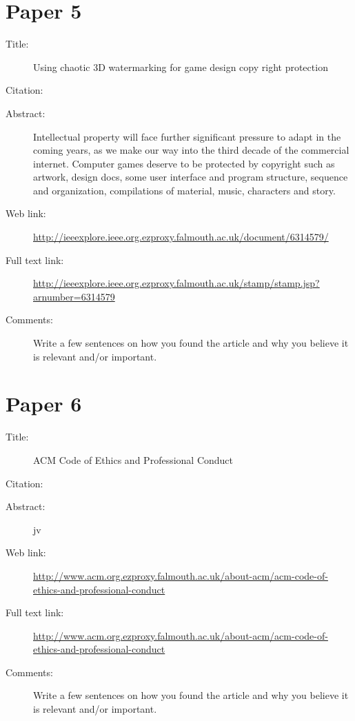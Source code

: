 \documentclass{scrartcl}
\begin{document}
\section*{Paper 5}
\begin{description}
\item[Title:] Using chaotic 3D watermarking for game design copy right protection
\item[Citation:] \cite{Chaotic}
\item[Abstract:] Intellectual property will face further significant pressure to adapt in the coming years, as we make our way into the third decade of the commercial internet. Computer games deserve to be protected by copyright such as artwork, design docs, some user interface and program structure, sequence and organization, compilations of material, music, characters and story.
\item[Web link:] \url{http://ieeexplore.ieee.org.ezproxy.falmouth.ac.uk/document/6314579/}
\item[Full text link:] \url{http://ieeexplore.ieee.org.ezproxy.falmouth.ac.uk/stamp/stamp.jsp?arnumber=6314579}
\item[Comments:] Write a few sentences on how you found the article and why you believe it is relevant and/or important.
\end{description}

\section*{Paper 6}
\begin{description}
\item[Title:] ACM Code of Ethics and Professional Conduct
\item[Citation:] \cite{Code-of-Ethics}
\item[Abstract:] jv
\item[Web link:] \url{http://www.acm.org.ezproxy.falmouth.ac.uk/about-acm/acm-code-of-ethics-and-professional-conduct}
\item[Full text link:] \url{http://www.acm.org.ezproxy.falmouth.ac.uk/about-acm/acm-code-of-ethics-and-professional-conduct}
\item[Comments:] Write a few sentences on how you found the article and why you believe it is relevant and/or important.
\end{description}
\end{document}

